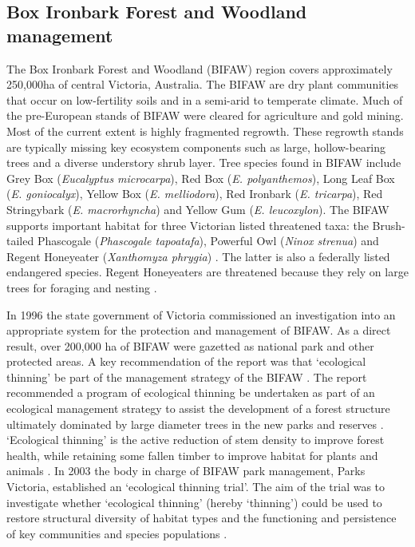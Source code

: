 \documentclass[]{article}
\begin{document}
\subsection{Box Ironbark Forest and Woodland
management}\label{box-ironbark-forest-and-woodland-management}

The Box Ironbark Forest and Woodland (BIFAW) region covers approximately
250,000ha of central Victoria, Australia. The BIFAW are dry plant
communities that occur on low-fertility soils and in a semi-arid to
temperate climate. Much of the pre-European stands of BIFAW were cleared
for agriculture and gold mining. Most of the current extent is highly
fragmented regrowth. These regrowth stands are typically missing key
ecosystem components such as large, hollow-bearing trees and a diverse
understory shrub layer. Tree species found in BIFAW include Grey Box
(\emph{Eucalyptus microcarpa}), Red Box (\emph{E. polyanthemos}), Long
Leaf Box (\emph{E. goniocalyx}), Yellow Box (\emph{E. melliodora}), Red
Ironbark (\emph{E. tricarpa}), Red Stringybark (\emph{E. macrorhyncha})
and Yellow Gum (\emph{E. leucoxylon}). The BIFAW supports important
habitat for three Victorian listed threatened taxa: the Brush-tailed
Phascogale (\emph{Phascogale tapoatafa}), Powerful Owl (\emph{Ninox
strenua}) and Regent Honeyeater (\emph{Xanthomyza phrygia})
\citep{Tzaros2005}. The latter is also a federally listed endangered
species. Regent Honeyeaters are threatened because they rely on large
trees for foraging and nesting \citep{Menkhorst1999}.

In 1996 the state government of Victoria commissioned an investigation
into an appropriate system for the protection and management of BIFAW.
As a direct result, over 200,000 ha of BIFAW were gazetted as national
park and other protected areas. A key recommendation of the report was
that `ecological thinning' be part of the management strategy of the
BIFAW \citep{Pigott2009}. The report recommended a program of ecological
thinning be undertaken as part of an ecological management strategy to
assist the development of a forest structure ultimately dominated by
large diameter trees in the new parks and reserves \citep{ECC2001}.
`Ecological thinning' is the active reduction of stem density to improve
forest health, while retaining some fallen timber to improve habitat for
plants and animals \citep{Cunningham2009}. In 2003 the body in charge of
BIFAW park management, Parks Victoria, established an `ecological
thinning trial'. The aim of the trial was to investigate whether
`ecological thinning' (hereby `thinning') could be used to restore
structural diversity of habitat types and the functioning and
persistence of key communities and species populations
\citep{Pigott2010}.
\end{document}
